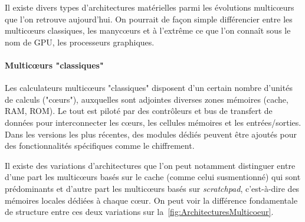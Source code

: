 \documentclass[french, a4paper, 11pt, twoside, pdftex]{StyleThese}
\begin{document}
		Il existe divers types d'architectures matérielles parmi les évolutions multicœurs que l'on retrouve aujourd'hui. On pourrait de façon simple différencier entre les multicœurs classiques, les manycœurs et à l'extrême ce que l'on connaît sous le nom de GPU, les processeurs graphiques.
		
		\paragraph{Multicœurs "classiques"} \label{Intro:multicoeurs}
		Les calculateurs multicœurs "classiques" disposent d'un certain nombre d'unités de calculs ("cœurs"), auxquelles sont adjointes diverses zones mémoires (cache, RAM, ROM). Le tout est piloté par des contrôleurs et bus de transfert de données pour interconnecter les cœurs, les cellules mémoires et les entrées/sorties. Dans les versions les plus récentes, des modules dédiés peuvent être ajoutés pour des fonctionnalités spécifiques comme le chiffrement.
			
		Il existe des variations d'architectures que l'on peut notamment distinguer entre d'une part les multicœurs basés sur le cache (comme celui susmentionné) qui sont prédominants et d'autre part les multicœurs basés sur \emph{scratchpad}, c'est-à-dire des mémoires locales dédiées à chaque cœur. On peut voir la différence fondamentale de structure entre ces deux variations sur la~\autoref{fig:ArchitecturesMulticoeur}.			
			
\end{document}

